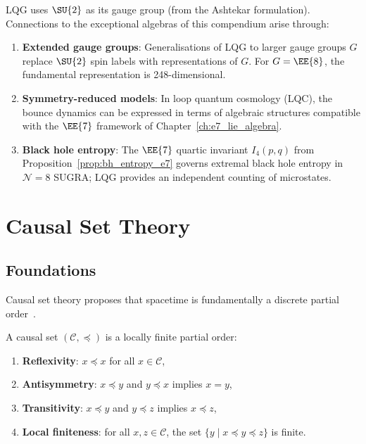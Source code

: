 LQG uses $\SU{2}$ as its gauge group (from the Ashtekar formulation).
Connections to the exceptional algebras of this compendium arise through:
\begin{enumerate}
    \item \textbf{Extended gauge groups}: Generalisations of LQG to
          larger gauge groups $G$ replace $\SU{2}$ spin labels with
          representations of $G$.  For $G = \EE{8}$, the fundamental
          representation is 248-dimensional.
    \item \textbf{Symmetry-reduced models}: In loop quantum cosmology
          (LQC), the bounce dynamics can be expressed in terms of
          algebraic structures compatible with the $\EE{7}$ framework
          of Chapter~\ref{ch:e7_lie_algebra}.
    \item \textbf{Black hole entropy}: The $\EE{7}$ quartic invariant
          $I_4(p,q)$ from Proposition~\ref{prop:bh_entropy_e7}
          governs extremal black hole entropy in $\mathcal{N}=8$ SUGRA;
          LQG provides an independent counting of microstates.
\end{enumerate}

\section{Causal Set Theory}
\label{sec:causal_sets}

\subsection{Foundations}

Causal set theory proposes that spacetime is fundamentally a discrete
partial order~\cite{sorkin2003causal}.

\begin{definition}
\label{def:causal_set}
A causal set $(\mathcal{C}, \preceq)$ is a locally finite partial order:
\begin{enumerate}
    \item \textbf{Reflexivity}: $x \preceq x$ for all $x \in \mathcal{C}$,
    \item \textbf{Antisymmetry}: $x \preceq y$ and $y \preceq x$ implies
          $x = y$,
    \item \textbf{Transitivity}: $x \preceq y$ and $y \preceq z$ implies
          $x \preceq z$,
    \item \textbf{Local finiteness}: for all $x, z \in \mathcal{C}$,
          the set $\{y \mid x \preceq y \preceq z\}$ is finite.
\end{enumerate}
\end{definition}

